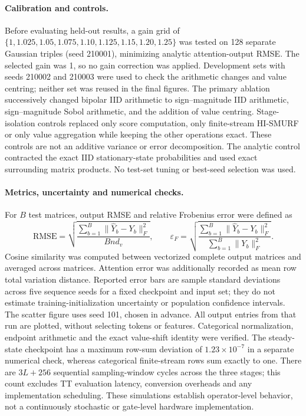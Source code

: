 \paragraph{Calibration and controls.}
Before evaluating held-out results, a gain grid of
$\{1,1.025,1.05,1.075,1.10,1.125,1.15,1.20,1.25\}$ was tested on 128
separate Gaussian triples (seed 210001), minimizing analytic attention-output
RMSE. The selected gain was 1, so no gain correction was applied.
Development sets with seeds 210002 and 210003 were used to check the arithmetic
changes and value centring; neither set was reused in the final figures.
The primary ablation successively changed bipolar IID arithmetic to
sign--magnitude IID arithmetic, sign--magnitude Sobol arithmetic, and the
addition of value centring. Stage-isolation controls replaced only score
computation, only finite-stream HI-SMURF or only value aggregation while
keeping the other operations exact. These controls are not an additive
variance or error decomposition. The analytic control contracted the exact
IID stationary-state probabilities and used exact surrounding matrix products.
No test-set tuning or best-seed selection was used.

\paragraph{Metrics, uncertainty and numerical checks.}
For $B$ test matrices, output RMSE and relative Frobenius error were defined as
\begin{equation}
\mathrm{RMSE}=\sqrt{\frac{\sum_{b=1}^{B}
\|\widehat{Y}_b-Y_b\|_F^2}{Bnd_v}},
\qquad
\varepsilon_F=\sqrt{\frac{\sum_{b=1}^{B}
\|\widehat{Y}_b-Y_b\|_F^2}{\sum_{b=1}^{B}\|Y_b\|_F^2}}.
\end{equation}
Cosine similarity was computed between vectorized complete output matrices
and averaged across matrices. Attention error was additionally recorded as
mean row total variation distance. Reported error bars are sample standard
deviations across five sequence seeds for a fixed checkpoint and input set;
they do not estimate training-initialization uncertainty or population
confidence intervals. The scatter figure uses seed 101, chosen in advance.
All output entries from that run are plotted, without selecting tokens or
features. Categorical normalization, endpoint arithmetic and the exact
value-shift identity were verified. The steady-state checkpoint has a maximum
row-sum deviation of $1.23\times10^{-7}$ in a separate numerical check,
whereas categorical finite-stream rows sum exactly to one.
There are $3L+256$ sequential sampling-window cycles across the three stages;
this count excludes TT evaluation latency, conversion overheads and any
implementation scheduling. These simulations establish operator-level
behavior, not a continuously stochastic or gate-level hardware implementation.
